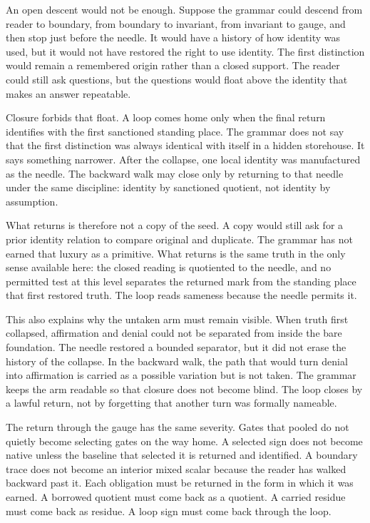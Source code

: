 An open descent would not be enough. Suppose the grammar could descend from
reader to boundary, from boundary to invariant, from invariant to gauge, and
then stop just before the needle. It would have a history of how identity
was used, but it would not have restored the right to use identity. The first
distinction would remain a remembered origin rather than a closed support.
The reader could still ask questions, but the questions would float above
the identity that makes an answer repeatable.

Closure forbids that float. A loop comes home only when the final return
identifies with the first sanctioned standing place. The grammar does not
say that the first distinction was always identical with itself in a hidden
storehouse. It says something narrower. After the collapse, one local
identity was manufactured as the needle. The backward walk may close only by
returning to that needle under the same discipline: identity by sanctioned
quotient, not identity by assumption.

What returns is therefore not a copy of the seed. A copy would still ask for
a prior identity relation to compare original and duplicate. The grammar has
not earned that luxury as a primitive. What returns is the same truth in the
only sense available here: the closed reading is quotiented to the needle,
and no permitted test at this level separates the returned mark from the
standing place that first restored truth. The loop reads sameness because the
needle permits it.

This also explains why the untaken arm must remain visible. When truth first
collapsed, affirmation and denial could not be separated from inside the bare
foundation. The needle restored a bounded separator, but it did not erase the
history of the collapse. In the backward walk, the path that would turn
denial into affirmation is carried as a possible variation but is not taken.
The grammar keeps the arm readable so that closure does not become blind.
The loop closes by a lawful return, not by forgetting that another turn was
formally nameable.

The return through the gauge has the same severity. Gates that pooled do not
quietly become selecting gates on the way home. A selected sign does not
become native unless the baseline that selected it is returned and
identified. A boundary trace does not become an interior mixed scalar because
the reader has walked backward past it. Each obligation must be returned in
the form in which it was earned. A borrowed quotient must come back as a
quotient. A carried residue must come back as residue. A loop sign must come
back through the loop.

